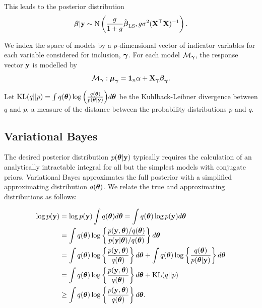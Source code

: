 \documentclass{amsart}[12pt]
\begin{document}
This leads to the posterior distribution
\[
	{\boldsymbol \beta} | {\bf y} \sim \text{N}\left(\frac{g}{1+g} \hat{{\boldsymbol \beta}}_{\text{LS}}, g \sigma^2 ({\bf X}^\top {\bf X})^{-1} \right).
\]

We index the space of models by a $p$-dimensional vector of indicator variables for each variable considered 
for inclusion, ${\boldsymbol \gamma}$. For each model $\mathcal{M}_{\boldsymbol \gamma}$, the response vector ${\bf y}$ is modelled by
\begin{equation*}
	\mathcal{M}_{\boldsymbol \gamma}: {\boldsymbol \mu}_{\boldsymbol \gamma} = {\bf 1}_n \alpha + {\bf X}_{\boldsymbol \gamma} {\boldsymbol \beta}_{\boldsymbol \gamma}.
\end{equation*}

Let $\text{KL}(q||p) = \int q({\boldsymbol \theta}) \log{\left( \frac{q({\boldsymbol\theta})}{p({\boldsymbol\theta}|{\bf y})} \right)} d {\boldsymbol \theta}$ be the
Kuhlback-Leibner divergence between $q$ and $p$, a measure of the distance between the probability
distributions $p$ and $q$.

\subsection{Variational Bayes}

The desired posterior distribution $p({\boldsymbol \theta} | {\bf y})$ typically requires the calculation of an analytically
intractable integral for all but the simplest models with conjugate priors. Variational Bayes approximates the
full posterior with a simplified approximating distribution $q({\boldsymbol \theta})$. We relate the true and
approximating distributions as follows:

\begin{align*}
	\log p({\bf y}) & = \log p({\bf y}) \int q({\boldsymbol \theta}) d {\boldsymbol \theta} = \int q({\boldsymbol \theta}) \log p({\bf y}) d {\boldsymbol \theta}                                    \\
	            & = \int q({\boldsymbol \theta}) \log \left\{ \frac{p({\bf y}, {\boldsymbol \theta}) / q({\boldsymbol \theta})}{p({\bf y}|{\boldsymbol \theta}) / q({\boldsymbol \theta})} \right\} d {\boldsymbol \theta} \\
	            & = \int q({\boldsymbol \theta}) \log\left\{ \frac{p({\bf y}, {\boldsymbol \theta})}{q({\boldsymbol \theta})} \right\} d {\boldsymbol \theta} +                              
	\int q({\boldsymbol \theta}) \log\left\{ \frac{q({\boldsymbol \theta})}{p({\boldsymbol \theta}|{\bf y})} \right\} d {\boldsymbol \theta} \\
	            & = \int q({\boldsymbol \theta}) \log\left\{ \frac{p({\bf y}, {\boldsymbol \theta})}{q({\boldsymbol \theta})} \right\} d {\boldsymbol \theta} +                              
	\text{KL}(q||p) \\
	            & \geq \int q({\boldsymbol \theta}) \log\left\{ \frac{p({\bf y}, {\boldsymbol \theta})}{q({\boldsymbol \theta})} \right\} d {\boldsymbol \theta}.                            
\end{align*}
\end{document}
